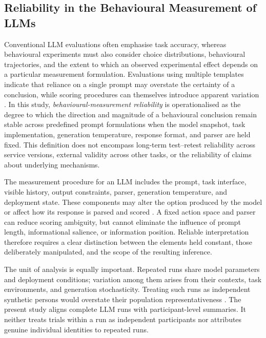 \subsection{Reliability in the Behavioural Measurement of LLMs}

Conventional LLM evaluations often emphasise task accuracy, whereas behavioural experiments must also consider choice distributions, behavioural trajectories, and the extent to which an observed experimental effect depends on a particular measurement formulation. Evaluations using multiple templates indicate that reliance on a single prompt may overstate the certainty of a conclusion, while scoring procedures can themselves introduce apparent variation \cite{Sclar2024PromptFormatting,Mizrahi2024MultiPrompt,Hua2025FlawArtifact}. In this study, \emph{behavioural-measurement reliability} is operationalised as the degree to which the direction and magnitude of a behavioural conclusion remain stable across predefined prompt formulations when the model snapshot, task implementation, generation temperature, response format, and parser are held fixed. This definition does not encompass long-term test--retest reliability across service versions, external validity across other tasks, or the reliability of claims about underlying mechanisms.

The measurement procedure for an LLM includes the prompt, task interface, visible history, output constraints, parser, generation temperature, and deployment state. These components may alter the option produced by the model or affect how its response is parsed and scored \cite{Webson2022PromptMeaning,Sclar2024PromptFormatting,Loya2023PromptSensitivityDecision,Chen2024ChatGPTBehavior,Hua2025FlawArtifact}. A fixed action space and parser can reduce scoring ambiguity, but cannot eliminate the influence of prompt length, informational salience, or information position. Reliable interpretation therefore requires a clear distinction between the elements held constant, those deliberately manipulated, and the scope of the resulting inference.

The unit of analysis is equally important. Repeated runs share model parameters and deployment conditions; variation among them arises from their contexts, task environments, and generation stochasticity. Treating such runs as independent synthetic persons would overstate their population representativeness \cite{Dillion2023ReplaceParticipants,Bisbee2024SyntheticSurveyData}. The present study aligns complete LLM runs with participant-level summaries. It neither treats trials within a run as independent participants nor attributes genuine individual identities to repeated runs.

